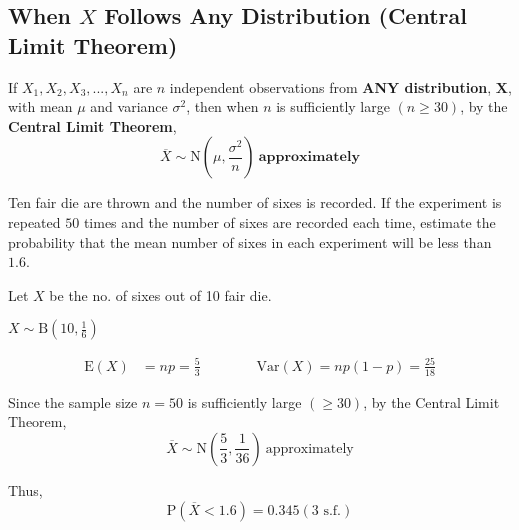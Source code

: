 \documentclass[11pt,a4paper]{book}
\begin{document}
\subsection{When $X$ Follows Any Distribution (Central Limit Theorem)}

\begin{tcolorbox}[colback=blue!5, colframe=black, boxrule=.4pt, sharpish corners]

If $X_{1},X_{2},X_{3},...,X_{n}$ are $n$ independent observations
from \textbf{ANY distribution}, $\boldsymbol{X}$, with mean $\mu$ and variance
$\sigma^{2}$, then when $n$ is sufficiently large $\left(n\geq30\right)$,
by the \textbf{Central Limit Theorem},
\[
\overline{X}\sim\text{N}\left(\mu,\frac{\sigma^{2}}{n}\right)\:\textbf{approximately}
\]

\end{tcolorbox}

\begin{example}

Ten fair die are thrown and the number of sixes is recorded. If the
experiment is repeated $50$ times and the number of sixes are recorded
each time, estimate the probability that the mean number of sixes
in each experiment will be less than $1.6$.

\Solution
Let $X$ be the no. of sixes out of 10 fair die.

${\displaystyle X\sim\text{B}\left(10,\frac{1}{6}\right)}$

\begin{align*}
\text{E}\left(X\right) & =np=\frac{5}{3}\qquad\qquad\text{Var}\left(X\right)=np\left(1-p\right)=\frac{25}{18}
\end{align*}

Since the sample size $n=50$ is sufficiently large $\left(\geq30\right)$,
by the Central Limit Theorem,
\[
\overline{X}\sim\text{N}\left(\frac{5}{3},\frac{1}{36}\right)\:\text{approximately}
\]

Thus,
\[
\text{P}\left(\overline{X}<1.6\right)=0.345(\text{3 s.f.})
\]
\end{example}
\end{document}
